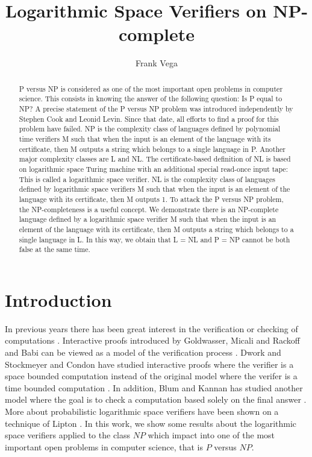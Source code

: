 \documentclass[a4paper,UKenglish,cleveref, autoref]{lipics-v2019}
\title{Logarithmic Space Verifiers on NP-complete} %
\author{Frank Vega}{Joysonic, Uzun Mirkova 5, Belgrade, 11000, Serbia} {vega.frank@gmail.com}{https://orcid.org/0000-0001-8210-4126}{}
\begin{document}
\maketitle

\begin{abstract}
P versus NP is considered as one of the most important open problems in computer science. This consists in knowing the answer of the following question: Is P equal to NP? A precise statement of the P versus NP problem was introduced independently by Stephen Cook and Leonid Levin. Since that date, all efforts to find a proof for this problem have failed. NP is the complexity class of languages defined by polynomial time verifiers M such that when the input is an element of the language with its certificate, then M outputs a string which belongs to a single language in P. Another major complexity classes are L and NL. The certificate-based definition of NL is based on logarithmic space Turing machine with an additional special read-once input tape: This is called a logarithmic space verifier. NL is the complexity class of languages defined by logarithmic space verifiers M such that when the input is an element of the language with its certificate, then M outputs 1. To attack the P versus NP problem, the NP-completeness is a useful concept. We demonstrate there is an NP-complete language defined by a logarithmic space verifier M such that when the input is an element of the language with its certificate, then M outputs a string which belongs to a single language in L. In this way, we obtain that L = NL and P = NP cannot be both false at the same time.
\end{abstract}

\section{Introduction}

In previous years there has been great interest in the verification or checking of computations \cite{LIP90}. Interactive proofs introduced by Goldwasser, Micali and Rackoff and Babi can be viewed as a model of the verification process \cite{LIP90}. Dwork and Stockmeyer and Condon have studied interactive proofs where the verifier is a space bounded computation instead of the original model where the verifer is a time bounded computation \cite{LIP90}. In addition, Blum and Kannan has studied another model where the goal is to check a computation based solely on the final answer \cite{LIP90}. More about probabilistic logarithmic space verifiers have been shown on a technique of Lipton \cite{LIP90}. In this work, we show some results about the logarithmic space verifiers applied to the class $NP$ which impact into one of the most important open problems in computer science, that is $P$ versus $NP$.
\end{document}
